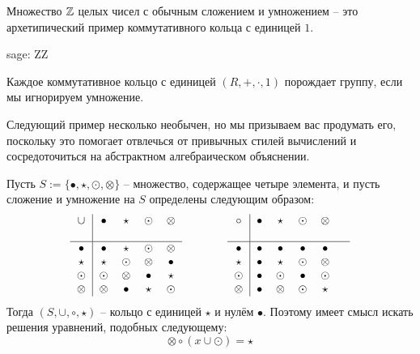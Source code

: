 \begin{example} Множество $\mathbb{Z}$ целых чисел с обычным сложением и умножением -- это архетипический пример коммутативного кольца с единицей $1$. 
\begin{sagecommandline}
sage: ZZ
\end{sagecommandline}
\end{example}
\begin{example} Каждое коммутативное кольцо с единицей $(R,+,\cdot,1)$ порождает группу, если мы игнорируем умножение.
\end{example}
Следующий пример несколько необычен, но мы призываем вас продумать его, поскольку это помогает отвлечься от привычных стилей вычислений и сосредоточиться на абстрактном алгебраическом объяснении.
\begin{example} Пусть $S:=\{\bullet,\star,\odot,\otimes\}$ -- множество, содержащее четыре элемента, и пусть сложение и умножение на $S$ определены следующим образом:
\begin{equation}\label{moon-table}
  \begin{tabular}{c | c c c c c c}
    $\cup$ & $\bullet$ & $\star$ & $\odot$ & $\otimes$ \\\\\hline
    $\bullet$ & $\bullet$ & $\star$ & $\odot$ & $\otimes$ \\
    $\star$ & $\star$ & $\odot$ & $\otimes$ & $\bullet$ \\
    $\odot$ & $\odot$ & $\otimes$ & $\bullet$ & $\star$ \\
    $\otimes$ & $\otimes$ & $\bullet$ & $\star$ & $\odot$ \\
  \end{tabular} \quad \quad \quad \quad
  \begin{tabular}{c | c c c c c c}
$ \circ $ & $\bullet$ & $\star$ & $\odot$ & $\otimes$ & \\\\\hline
        $\bullet$ & $\bullet$ & $\bullet$ & $\bullet$ & $\bullet$ &\\
        $\star$ & $\bullet$ & $\star$ & $\odot$ & $\otimes$ &\\
        $\odot$ & $\bullet$ & $\odot$ & $\bullet$ & $\odot$ &\\
        $\otimes$ & $\bullet$ & $\otimes$ & $\odot$ & $\star$ &\\
  \end{tabular}
\end{equation}
Тогда $(S,\cup,\circ, \star)$ -- кольцо с единицей $\star$ и нулём $\bullet$. Поэтому имеет смысл искать решения уравнений, подобных следующему:
\begin{equation}\label{eq:moon}
\otimes \circ (x \cup \odot ) = \star
\end{equation}


\end{example}
